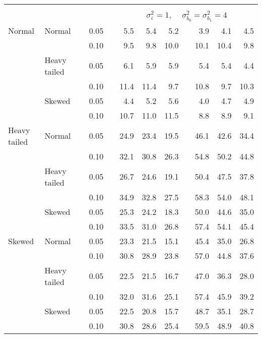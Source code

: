 \begin{table}[ht]
\begin{scriptsize}
\begin{center}
\begin{tabular}{ll p{.1cm} c p{.1cm} rrr p{.1cm} rrr}
&&&&&&&&&&&\\
& && && \multicolumn{7}{c}{$\sigma_{\varepsilon}^2 = 1$, \ \ $\sigma_{b_0}^2 = \sigma_{b_1}^2 = 4$} \\ \cline{6-12}
Normal       & Normal       && 0.05 &&   5.5 & 5.4 & 5.2 &   & 3.9 & 4.1 & 4.5 \\ 
             &              && 0.10 &&   9.5 & 9.8 & 10.0 &   & 10.1 & 10.4 & 9.8 \\ 
             & Heavy tailed && 0.05 &&   6.1 & 5.9 & 5.9 &   & 5.4 & 5.4 & 4.4 \\ 
             &              && 0.10 &&   11.4 & 11.4 & 9.7 &   & 10.8 & 9.7 & 10.3 \\ 
             & Skewed       && 0.05 &&   4.4 & 5.2 & 5.6 &   & 4.0 & 4.7 & 4.9 \\ 
             &              && 0.10 &&   10.7 & 11.0 & 11.5 &   & 8.8 & 8.9 & 9.1 \\ 
Heavy tailed & Normal       && 0.05 &&   24.9 & 23.4 & 19.5 &   & 46.1 & 42.6 & 34.4 \\ 
             &              && 0.10 &&   32.1 & 30.8 & 26.3 &   & 54.8 & 50.2 & 44.8 \\ 
             & Heavy tailed && 0.05 &&   26.7 & 24.6 & 19.1 &   & 50.4 & 47.5 & 37.8 \\ 
             &              && 0.10 &&   34.9 & 32.8 & 27.5 &   & 58.3 & 54.0 & 48.1 \\ 
             & Skewed       && 0.05 &&   25.3 & 24.2 & 18.3 &   & 50.0 & 44.6 & 35.0 \\ 
             &              && 0.10 &&   33.5 & 31.0 & 26.8 &   & 57.4 & 54.1 & 45.4 \\ 
Skewed       & Normal       && 0.05 &&   23.3 & 21.5 & 15.1 &   & 45.4 & 35.0 & 26.8 \\ 
             &              && 0.10 &&   30.8 & 28.9 & 23.8 &   & 57.0 & 44.8 & 37.6 \\ 
             & Heavy tailed && 0.05 &&   22.5 & 21.5 & 16.7 &   & 47.0 & 36.3 & 28.0 \\ 
             &              && 0.10 &&   32.0 & 31.6 & 25.1 &   & 57.4 & 45.9 & 39.2 \\ 
             & Skewed       && 0.05 &&   22.5 & 20.8 & 15.7 &   & 48.7 & 35.1 & 28.7 \\ 
             &              && 0.10 &&   30.8 & 28.6 & 25.4 &   & 59.5 & 48.9 & 40.8 \\ 

\hline
\end{tabular}
\end{center}
\end{scriptsize}
\end{table}

